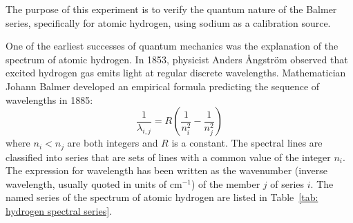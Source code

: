 \documentclass[addpoints]{physlabs}
\begin{document}
\begin{labsection}

\begin{objective}
    The purpose of this experiment is to verify the quantum nature of the Balmer series, specifically for atomic hydrogen, using sodium as a calibration source.
\end{objective}

\begin{theory}

One of the earliest successes of quantum mechanics was the explanation of the spectrum of atomic hydrogen. In 1853, physicist Anders {\AA}ngstr\"{o}m observed that excited hydrogen gas emits light at regular discrete wavelengths. Mathematician Johann Balmer developed an empirical formula predicting the sequence of wavelengths in 1885:
%
\begin{equation}\label{eq: balmer's formula}
    \frac{1}{\lambda_{i,j}} = R\left(\frac{1}{n_i^2} - \frac{1}{n_j^2}\right)
\end{equation}
%
where $n_i<n_j$ are both integers and $R$ is a constant. The spectral lines are classified into series that are sets of lines with a common value of the integer $n_i$. The expression for wavelength has been written as the wavenumber (inverse wavelength, usually quoted in units of cm$^{-1}$) of the member $j$ of series $i$. The named series of the spectrum of atomic hydrogen are listed in Table~\ref{tab: hydrogen spectral series}.


\end{theory}
\end{labsection}
\end{document}
